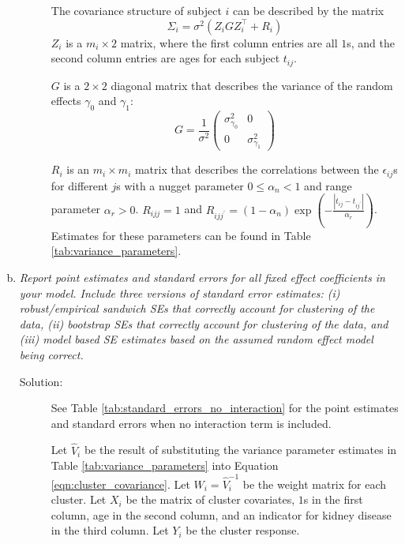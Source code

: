 \documentclass[11pt, letterpaper]{article}
\begin{document}
\begin{enumerate}[(a)]
\begin{description}
  The covariance structure of subject $i$ can be described by the matrix
  \begin{equation}
    \Sigma_i = \sigma^2\left(Z_iGZ_i^\intercal + R_i\right)
    \label{eqn:cluster_covariance}
  \end{equation}
  $Z_i$ is a $m_i \times 2$ matrix, where the first column entries are all $1$s,
  and the second column entries are ages for each subject $t_{ij}$.

  $G$ is a $2 \times 2$ diagonal matrix that describes the variance of the
  random effects $\gamma_0$ and $\gamma_1$:
  \begin{equation}
    G = \frac{1}{\sigma^2}\begin{pmatrix}
      \sigma^2_{\gamma_0} & 0 \\
      0 & \sigma^2_{\gamma_1}
    \end{pmatrix}
    \label{eqn:random_effects_covariance}
  \end{equation}

  $R_i$ is an $m_i \times m_i$ matrix that describes the correlations between
  the $\epsilon_{ij}$s for different $j$s with a nugget parameter
  $0 \leq \alpha_n < 1$ and range parameter $\alpha_r > 0$. $R_{ijj} = 1$ and
  $R_{ijj^\prime} = \left(1 - \alpha_n\right) \exp\left(-\frac{\left\lvert
        t_{ij} - t_{ij^\prime}\right\rvert}{\alpha_r}\right)$. Estimates for
  these parameters can be found in Table \ref{tab:variance_parameters}.
\end{description}

\item {\em  Report point estimates and standard errors for all fixed effect
coefficients in your model.  Include three versions of standard error estimates: (i) robust/empirical sandwich SEs that correctly
account for clustering of the data, (ii) bootstrap SEs that correctly account for clustering of the data, and (iii) model based SE estimates based on the assumed random effect model being correct.}



\begin{description}
\item[Solution:] See Table \ref{tab:standard_errors_no_interaction} for the
  point estimates and standard errors when no interaction term is included.

  Let $\hat{V}_i$ be the result of substituting the variance parameter estimates
  in Table \ref{tab:variance_parameters} into Equation
  \ref{eqn:cluster_covariance}. Let $W_i = \hat{V}_i^{-1}$ be the weight matrix
  for each cluster. Let $X_i$ be the matrix of cluster covariates, $1$s in the
  first column, age in the second column, and an indicator for kidney disease in
  the third column. Let $Y_i$ be the cluster response.


\end{description}
\end{enumerate}
\end{document}
